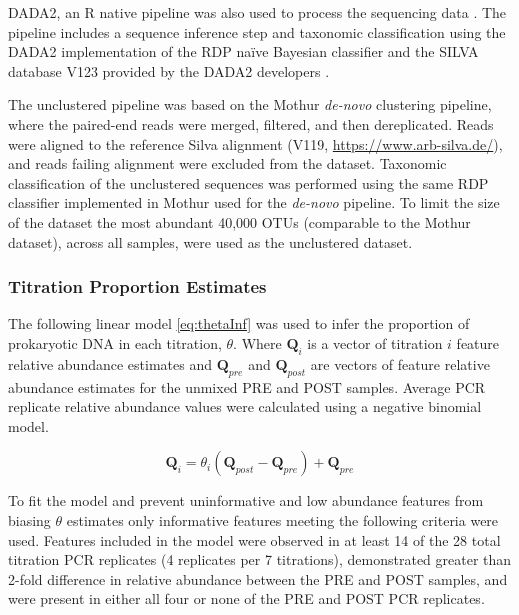 \documentclass{bmcart}
\begin{document}
DADA2, an R native pipeline was also used to process the sequencing data
\cite{callahan2016dada2}. The pipeline includes a sequence inference
step and taxonomic classification using the DADA2 implementation of the
RDP naïve Bayesian classifier \cite{wang2007naive} and the SILVA
database V123 provided by the DADA2 developers
\cite[\url{https://benjjneb.github.io/dada2/training.html}]{quast2012silva}.

The unclustered pipeline was based on the Mothur \emph{de-novo}
clustering pipeline, where the paired-end reads were merged, filtered,
and then dereplicated. Reads were aligned to the reference Silva
alignment (V119, \url{https://www.arb-silva.de/}), and reads failing
alignment were excluded from the dataset. Taxonomic classification of
the unclustered sequences was performed using the same RDP classifier
implemented in Mothur used for the \emph{de-novo} pipeline. To limit the
size of the dataset the most abundant 40,000 OTUs (comparable to the
Mothur dataset), across all samples, were used as the unclustered
dataset.

\subsubsection*{Titration Proportion Estimates}

The following linear model \eqref{eq:thetaInf} was used to infer the
proportion of prokaryotic DNA in each titration, \(\theta\). Where
\(\textbf{Q}_{i}\) is a vector of titration \(i\) feature relative
abundance estimates and \(\textbf{Q}_{pre}\) and \(\textbf{Q}_{post}\)
are vectors of feature relative abundance estimates for the unmixed PRE
and POST samples. Average PCR replicate relative abundance values were
calculated using a negative binomial model.

\begin{equation}
  \textbf{Q}_{i} = \theta_i (\textbf{Q}_{post} -\textbf{Q}_{pre}) + \textbf{Q}_{pre}
  \label{eq:thetaInf}
\end{equation}

To fit the model and prevent uninformative and low abundance features
from biasing \(\theta\) estimates only informative features meeting the
following criteria were used. Features included in the model were
observed in at least 14 of the 28 total titration PCR replicates (4
replicates per 7 titrations), demonstrated greater than 2-fold
difference in relative abundance between the PRE and POST samples, and
were present in either all four or none of the PRE and POST PCR
replicates.
\end{document}
